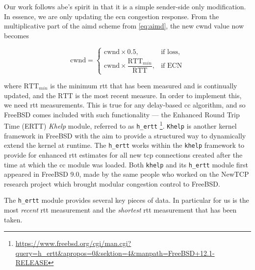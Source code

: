 Our work follows \gls{abe}'s spirit in that it is a simple sender-side only modification. In essence, we are only updating the \gls{ecn} congestion response. From the multiplicative part of the \gls{aimd} scheme from \ref{eq:aimd}, the new \gls{cwnd} value now becomes

\begin{equation} \label{eq:cwnd_improved_abe}
    \mathrm{cwnd} = \begin{cases}
        \mathrm{cwnd} \times 0.5, & \text{if loss},\\
        \mathrm{cwnd} \times \dfrac{\mathrm{RTT}_{min}}{\mathrm{RTT}}, & \text{if ECN}
    \end{cases}
\end{equation}

where $\mathrm{RTT}_{min}$ is the minimum \gls{rtt} that has been measured and is continually updated, and the $\mathrm{RTT}$ is the most recent measure. In order to implement this, we need \gls{rtt} measurements. This is true for any delay-based \gls{cc} algorithm, and so FreeBSD comes included with such functionality --- the Enhanced	Round Trip Time (ERTT) \textit{Khelp} module, referred to as \lstinline{h_ertt} \footnote{\url{https://www.freebsd.org/cgi/man.cgi?query=h_ertt&apropos=0&sektion=4&manpath=FreeBSD+12.1-RELEASE}}. \lstinline{Khelp} is another kernel framework in FreeBSD with the aim to provide a structured way to dynamically extend the kernel at runtime. The \lstinline{h_ertt} works within the \lstinline{khelp} framework to provide for enhanced \gls{rtt} estimates for all new \gls{tcp} connections created after the time at which the \gls{cc} module was loaded. Both \lstinline{khelp} and its \lstinline{h_ertt} module first appeared in FreeBSD 9.0, made by the same people who worked on the NewTCP research project which brought modular congestion control to FreeBSD.

The \lstinline{h_ertt} module provides several key pieces of data. In particular for us is the most \textit{recent} \gls{rtt} measurement and the \textit{shortest} \gls{rtt} measurement that has been taken.

